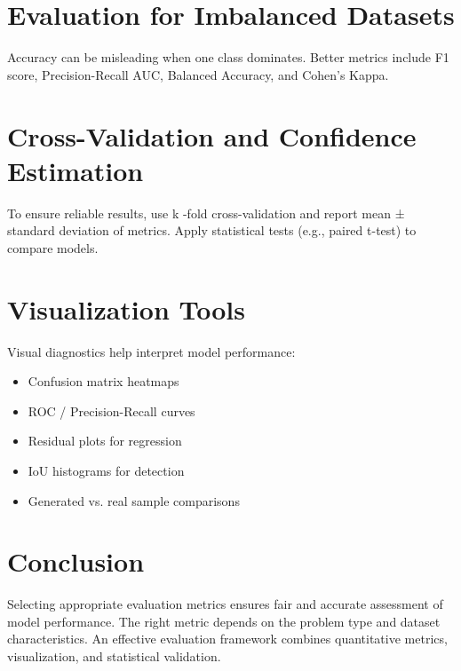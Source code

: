 \documentclass[10pt]{article}
\begin{document}
\section*{Evaluation for Imbalanced Datasets}
Accuracy can be misleading when one class dominates. Better metrics include F1 score, Precision-Recall AUC, Balanced Accuracy, and Cohen's Kappa.

\section*{Cross-Validation and Confidence Estimation}
To ensure reliable results, use k -fold cross-validation and report mean ± standard deviation of metrics. Apply statistical tests (e.g., paired t-test) to compare models.

\section*{Visualization Tools}
Visual diagnostics help interpret model performance:

\begin{itemize}
  \item Confusion matrix heatmaps
  \item ROC / Precision-Recall curves
  \item Residual plots for regression
  \item IoU histograms for detection
  \item Generated vs. real sample comparisons
\end{itemize}

\section*{Conclusion}
Selecting appropriate evaluation metrics ensures fair and accurate assessment of model performance. The right metric depends on the problem type and dataset characteristics. An effective evaluation framework combines quantitative metrics, visualization, and statistical validation.
\end{document}
